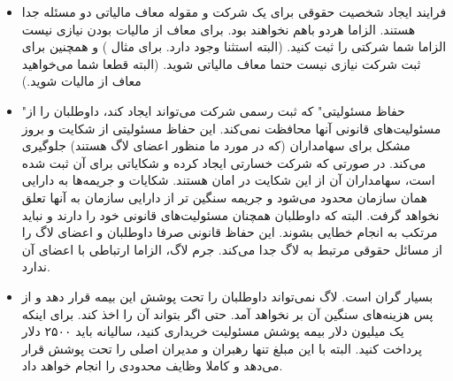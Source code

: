 \begin{itemize}
\item
فرایند ایجاد شخصیت حقوقی برای یک شرکت و مقوله معاف مالیاتی
دو مسئله جدا هستند. الزاما هردو باهم نخواهند بود. برای معاف از مالیات
بودن نیازی نیست الزاما شما شرکتی را ثبت کنید. (البته استثنا وجود دارد.
برای مثال
)
و همچنین برای ثبت شرکت نیازی نیست حتما معاف مالیاتی شوید.
(البته قطعا شما می‌خواهید معاف از مالیات شوید.)

\item
"حفاظ مسئولیتی" که ثبت رسمی شرکت می‌تواند ایجاد کند، داوطلبان را از
مسئولیت‌های قانونی آنها محافظت نمی‌کند. این حفاظ مسئولیتی از شکایت و
بروز مشکل برای سهامداران (که در مورد ما منظور اعضای لاگ هستند) جلوگیری
می‌کند. در صورتی که شرکت خسارتی ایجاد کرده و شکایاتی برای آن ثبت شده است،
سهامداران آن از این شکایت در امان هستند. شکایات و جریمه‌ها به دارایی همان
سازمان محدود می‌شود و جریمه سنگین تر از دارایی سازمان به آنها تعلق نخواهد گرفت.
البته که داوطلبان همچنان مسئولیت‌های قانونی خود را دارند و نباید مرتکب به
انجام خطایی بشوند. این حفاظ قانونی صرفا داوطلبان و اعضای لاگ را از مسائل
حقوقی مرتبط به لاگ جدا می‌کند. جرم لاگ، الزاما ارتباطی با اعضای آن ندارد.

\item

بسیار گران است. لاگ نمی‌تواند داوطلبان را تحت پوشش این بیمه قرار دهد و
از پس هزینه‌های سنگین آن بر نخواهد آمد. حتی اگر بتواند آن را اخذ کند.
برای اینکه یک میلیون دلار بیمه پوشش مسئولیت خریداری کنید، سالیانه باید
۲۵۰۰ دلار پرداخت کنید. البته با این مبلغ تنها رهبران و مدیران اصلی را تحت
پوشش قرار می‌دهد و کاملا وظایف محدودی را انجام خواهد داد.


\end{itemize}
